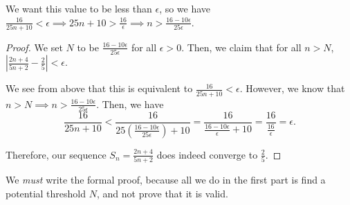 \documentclass{book}
\begin{document}
We want this value to be less than $\epsilon$, so we have $\frac{16}{25n + 10} < \epsilon \implies 25n + 10 > \frac{16}{\epsilon} \implies n > \frac{16 - 10 \epsilon}{25\epsilon}$.

\begin{proof}
    We set $N$ to be $\frac{16 - 10 \epsilon}{25 \epsilon}$ for all $\epsilon > 0$. Then, we claim that for all $n > N$, $|\frac{2n + 4}{5n + 2} - \frac{2}{5}| < \epsilon$.

    We see from above that this is equivalent to $\frac{16}{25n + 10} < \epsilon$. However, we know that $n > N \implies n > \frac{16 - 10 \epsilon}{25 \epsilon}$. Then, we have 
    \[ \frac{16}{25n + 10} < \frac{16}{25\left(\frac{16 - 10 \epsilon}{25 \epsilon} \right) + 10} = \frac{16}{\frac{16 - 10 \epsilon}{\epsilon} + 10} = \frac{16}{\frac{16}{\epsilon}} = \epsilon.\]

    Therefore, our sequence $S_n = \frac{2n + 4}{5n + 2}$ does indeed converge to $\frac{2}{5}$.
\end{proof}

We \textit{must} write the formal proof, because all we do in the first part is find a potential threshold $N$, and not prove that it is valid.
\end{document}
